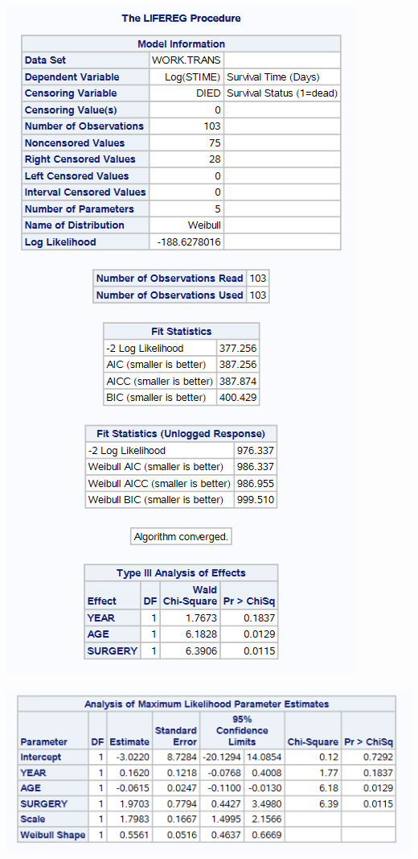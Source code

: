 \documentclass[
  12pt,
  letterpaper,
  DIV=11,
  numbers=noendperiod,
  onepage,
  openany]{scrreprt}
\begin{document}
\includegraphics{sas/8a.PNG}

\includegraphics{sas/8b.PNG}
\end{document}
